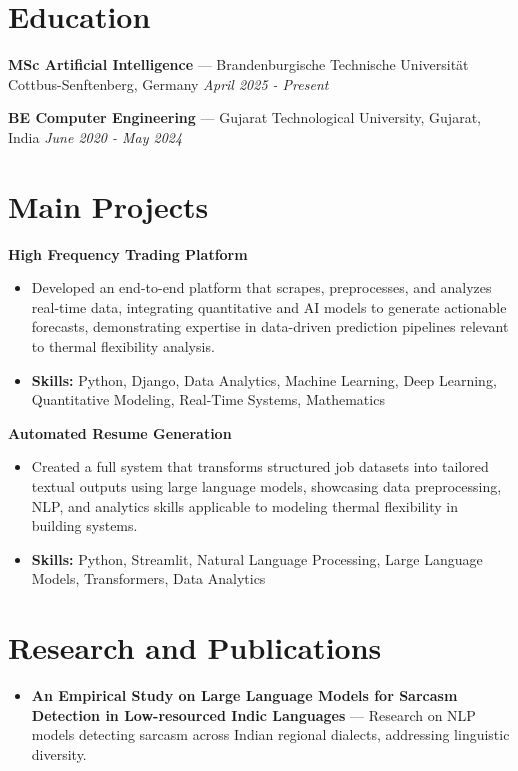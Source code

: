 \documentclass[a4paper,10pt]{article}
\begin{document}
\section*{Education}
\textbf{MSc Artificial Intelligence} — Brandenburgische Technische Universität Cottbus-Senftenberg, Germany \hfill \textit{April 2025 - Present}\par
\vspace{1.5pt}
\textbf{BE Computer Engineering} — Gujarat Technological University, Gujarat, India \hfill \textit{June 2020 - May 2024}\par

\section*{Main Projects}
\textbf{High Frequency Trading Platform}\par
\vspace{1pt}
\begin{itemize}
  \item Developed an end-to-end platform that scrapes, preprocesses, and analyzes real-time data, integrating quantitative and AI models to generate actionable forecasts, demonstrating expertise in data-driven prediction pipelines relevant to thermal flexibility analysis.
  \item \textbf{Skills:} Python, Django, Data Analytics, Machine Learning, Deep Learning, Quantitative Modeling, Real-Time Systems, Mathematics
\end{itemize}
\vspace{3pt}
\textbf{Automated Resume Generation}\par
\vspace{1pt}
\begin{itemize}
  \item Created a full system that transforms structured job datasets into tailored textual outputs using large language models, showcasing data preprocessing, NLP, and analytics skills applicable to modeling thermal flexibility in building systems.
  \item \textbf{Skills:} Python, Streamlit, Natural Language Processing, Large Language Models, Transformers, Data Analytics
\end{itemize}

\section*{Research and Publications}
\begin{itemize}
\item \textbf{An Empirical Study on Large Language Models for Sarcasm Detection in Low-resourced Indic Languages} — Research on NLP models detecting sarcasm across Indian regional dialects, addressing linguistic diversity.
\end{itemize}
\end{document}
